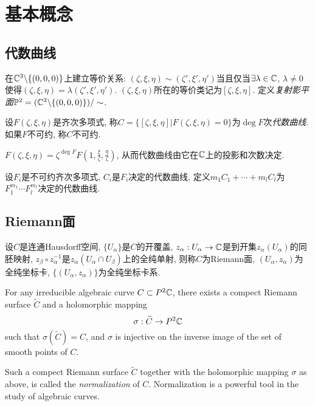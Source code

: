 \chapter{基本概念}\label{c1}
\section{代数曲线}\label{s1-1}
\begin{definition}
    在$\mathbb{C}^3\backslash\{(0,0,0)\}$上建立等价关系: $(\zeta,\xi,\eta)\sim(\zeta',\xi',\eta')$当且仅当$\exists\lambda\in\mathbb{C}$, $\lambda\neq0$使得$(\zeta,\xi,\eta)=\lambda(\zeta',\xi',\eta')$. $(\zeta,\xi,\eta)$所在的等价类记为$[\zeta,\xi,\eta]$. 定义\textit{复射影平面}$\mathbb{P}^2=(\mathbb{C}^3\backslash\{(0,0,0)\})/\sim$. 
\end{definition}
\begin{definition}
    设$F(\zeta,\xi,\eta)$是齐次多项式, 称$C=\{[\zeta,\xi,\eta]|F(\zeta,\xi,\eta)=0\}$为$\deg F$次\textit{代数曲线}. 如果$F$不可约, 称$C$不可约. 
\end{definition}
\begin{remark}$F(\zeta,\xi,\eta)=\zeta^{\deg F}F(1,\frac\xi\zeta,\frac\eta\zeta)$, 从而代数曲线由它在$\mathbb{C}$上的投影和次数决定. 
\end{remark}
\begin{definition}
    设$F_i$是不可约齐次多项式, $C_i$是$F_i$决定的代数曲线, 定义$m_1C_1+\cdots+m_l C_l$为$F_1^{m_1}\cdots F_l^{m_l}$决定的代数曲线. 
\end{definition}
\section{Riemann面}\label{s1-2}
\begin{definition}
    设$C$是连通Hausdorff空间, $\{U_\alpha\}$是$C$的开覆盖, $z_\alpha:U_\alpha\to\mathbb{C}$是到开集$z_\alpha(U_\alpha)$的同胚映射, $z_\beta\circ z_\alpha^{-1}$是$z_\alpha(U_\alpha\cap U_\beta)$上的全纯单射, 则称$C$为Riemann面, $(U_\alpha,z_\alpha)$为全纯坐标卡, $\{(U_\alpha,z_\alpha)\}$为全纯坐标卡系. 
\end{definition}
\begin{theorem}
    For any irreducible algebraic curve $C\subset P^2\mathbb{C}$, there exists a compect Riemann surface $\widetilde{C}$ and a holomorphic mapping 
    \[\sigma:\widetilde{C}\to P^2\mathbb{C}\]
    such that $\sigma(\widetilde{C})=C$, and $\sigma$ is injective on the inverse image of the set of smooth points of $C$. 
\end{theorem}

Such a compect Riemann surface $\widetilde{C}$ together with the holomorphic mapping $\sigma$ as above, is called the \textit{normalization} of $C$. Normalization is a powerful tool in the study of algebraic curves. 

